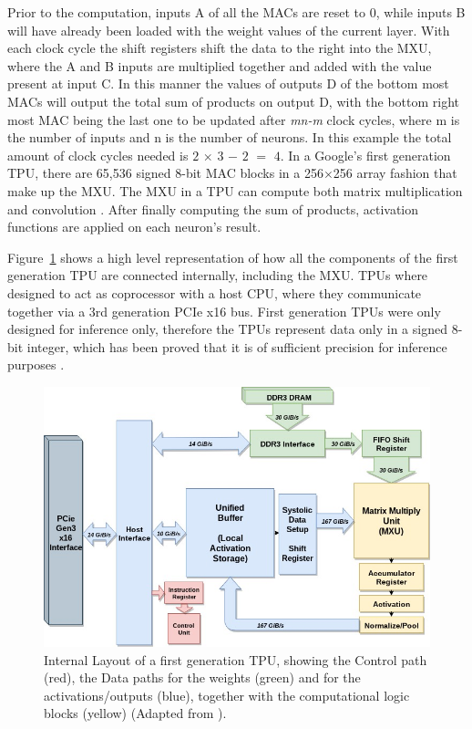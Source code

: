 Prior to the computation, inputs A of all the MACs are reset to 0, while inputs B will have already been loaded with the weight values of the current layer. With each clock cycle the shift registers shift the data to the right into the MXU, where the A and B inputs are multiplied together and added with the value present at input C. In this manner the values of outputs D of the bottom most MACs will output the total sum of products on output D, with the bottom right most MAC being the last one to be updated after \textit{mn-m} clock cycles, where m is the number of inputs and n is the number of neurons. In this example the total amount of clock cycles needed is $2$ $\times$ $3$ $-$ $2$ $=$ $4$. In a Google's first generation TPU, there are 65,536 signed 8-bit MAC blocks in a 256$\times$256 array fashion that make up the MXU. The MXU in a TPU can compute both matrix multiplication and convolution \citep{sato}. After finally computing the sum of products, activation functions are applied on each neuron's result.

Figure~\ref{fig:layouttpu} shows a high level representation of how all the components of the first generation TPU are connected internally, including the MXU. TPUs where designed to act as coprocessor with a host CPU, where they communicate together via a 3rd generation PCIe x16 bus. First generation TPUs were only designed for inference only, therefore the TPUs represent data only in a signed 8-bit integer, which has been proved that it is of sufficient precision for inference purposes \citep{jouppi2017datacenter}. 

\begin{figure}
  \includegraphics{graphics/tensor_processing_unit/tensor_processing_unit_arch.jpg}
  \caption{
    Internal Layout of a first generation TPU, showing the Control path (red), the Data paths for the weights (green) and for the activations/outputs (blue), together with the computational logic blocks (yellow) (Adapted from \citep{sato}).
  }
  \label{fig:layouttpu}
\end{figure}

